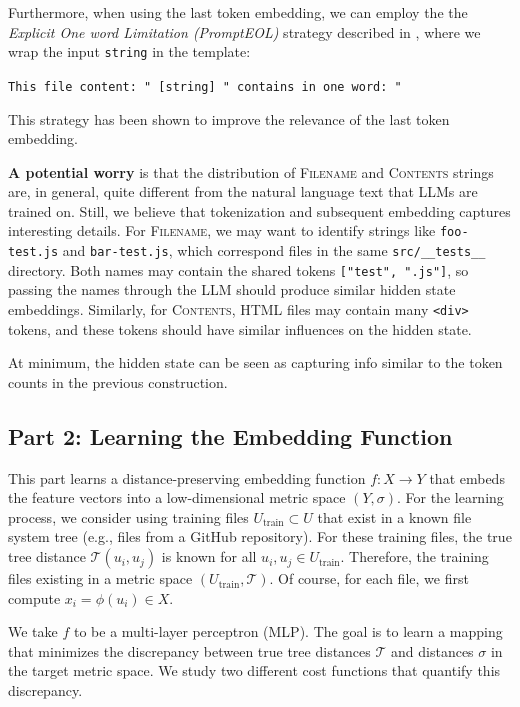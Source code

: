 \documentclass{article}
\begin{document}
Furthermore, when using the last token embedding, we can employ the the \emph{Explicit One word Limitation (PromptEOL)} strategy described in \cite{jiang2023scalingsentenceembeddingslarge}, where we wrap the input \texttt{string} in the template:
\begin{center}
  \texttt{This file content: " [string] " contains in one word: "}
\end{center}
This strategy has been shown to improve the relevance of the last token embedding.

\textbf{A potential worry} is that the distribution of \textsc{Filename} and \textsc{Contents} strings are, in general, quite different from the natural language text that LLMs are trained on. Still, we believe that tokenization and subsequent embedding captures interesting details. For \textsc{Filename}, we may want to identify strings like \texttt{foo-test.js} and \texttt{bar-test.js}, which correspond files in the same \texttt{src/\_\_tests\_\_} directory. Both names may contain the shared tokens \texttt{["test", ".js"]}, so passing the names through the LLM should produce similar hidden state embeddings. Similarly, for \textsc{Contents}, HTML files may contain many \texttt{<div>} tokens, and these tokens should have similar influences on the hidden state.

At minimum, the hidden state can be seen as capturing info similar to the token counts in the previous construction.

\subsection{Part 2: Learning the Embedding Function}

This part learns a distance-preserving embedding function $f: X \to Y$ that embeds the feature vectors into a low-dimensional metric space $(Y, \sigma)$. For the learning process, we consider using training files $U_\text{train} \subset U$ that exist in a known file system tree (e.g., files from a GitHub repository). For these training files, the true tree distance $\mathcal T(u_i, u_j)$ is known for all $u_i, u_j \in U_\text{train}$. Therefore, the training files existing in a metric space $(U_\text{train}, \mathcal T)$. Of course, for each file, we first compute $x_i = \phi(u_i) \in X$.

We take $f$ to be a multi-layer perceptron (MLP). The goal is to learn a mapping that minimizes the discrepancy between true tree distances $\mathcal T$ and distances $\sigma$ in the target metric space. We study two different cost functions that quantify this discrepancy.
\end{document}
